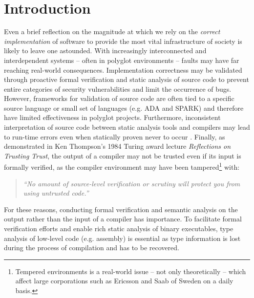 
\section{Introduction}


Even a brief reflection on the magnitude at which we rely on the \textit{correct implementation} of software to provide the most vital infrastructure of society is likely to leave one astounded. With increasingly interconnected and interdependent systems -- often in polyglot environments -- faults may have far reaching real-world consequences. Implementation correctness may be validated through proactive formal verification and static analysis of source code to prevent entire categories of security vulnerabilities and limit the occurrence of bugs. However, frameworks for validation of source code are often tied to a specific source language or small set of languages (e.g. ADA and SPARK) and therefore have limited effectiveness in polyglot projects. Furthermore, inconsistent interpretation of source code between static analysis tools and compilers may lead to run-time errors even when statically proven never to occur \cite{ada_static_analysis_and_compiler_inconsistencies,wysinwyx}. Finally, as demonstrated in Ken Thompson's 1984 Turing award lecture \textit{Reflections on Trusting Trust}, the output of a compiler may not be trusted even if its input is formally verified, as the compiler environment may have been tampered\footnote{Tempered environments is a real-world issue -- not only theoretically -- which affect large corporations such as Ericsson and Saab of Sweden on a daily basis.} with:

\begin{quote}
	\textit{``No amount of source-level verification or scrutiny will protect you from using untrusted code.''} \cite{trusting_trust}
\end{quote}

For these reasons, conducting formal verification and semantic analysis on the output rather than the input of a compiler has importance. To facilitate formal verification efforts and enable rich static analysis of binary executables, type analysis of low-level code (e.g. assembly) is essential as type information is lost during the process of compilation and has to be recovered.

